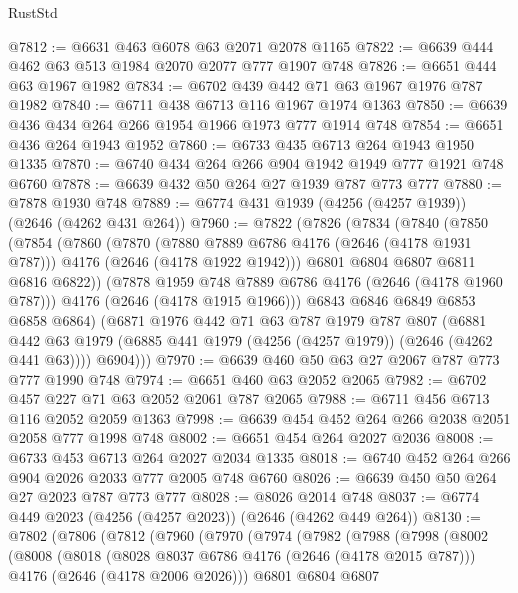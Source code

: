 \begin{lexlean}{RustStd}
\begin{coremodule}
@7812 := @6631 @463 @6078 @63 @2071 @2078 @1165
@7822 := @6639 @444 @462 @63 @513 @1984 @2070 @2077 @777 @1907 @748
@7826 := @6651 @444 @63 @1967 @1982
@7834 := @6702 @439 @442 @71 @63 @1967 @1976 @787 @1982
@7840 := @6711 @438 @6713 @116 @1967 @1974 @1363
@7850 := @6639 @436 @434 @264 @266 @1954 @1966 @1973 @777 @1914 @748
@7854 := @6651 @436 @264 @1943 @1952
@7860 := @6733 @435 @6713 @264 @1943 @1950 @1335
@7870 := @6740 @434 @264 @266 @904 @1942 @1949 @777 @1921 @748 @6760
@7878 := @6639 @432 @50 @264 @27 @1939 @787 @773 @777
@7880 := @7878 @1930 @748
@7889 := @6774 @431 @1939 (@4256 (@4257 @1939)) (@2646 (@4262 @431 @264))
@7960 := @7822
    (@7826
      (@7834
        (@7840
          (@7850
            (@7854
              (@7860
                (@7870
                  (@7880 @7889 @6786 @4176 (@2646 (@4178 @1931 @787)))
                  @4176
                  (@2646 (@4178 @1922 @1942)))
                @6801
                @6804
                @6807
                @6811
                @6816
                @6822))
            (@7878 @1959 @748 @7889 @6786 @4176 (@2646 (@4178 @1960 @787)))
            @4176
            (@2646 (@4178 @1915 @1966)))
          @6843
          @6846
          @6849
          @6853
          @6858
          @6864)
        (@6871
          @1976
          @442
          @71
          @63
          @787
          @1979
          @787
          @807
          (@6881 @442 @63 @1979 (@6885 @441 @1979 (@4256 (@4257 @1979)) (@2646 (@4262 @441 @63))))
          @6904)))
@7970 := @6639 @460 @50 @63 @27 @2067 @787 @773 @777 @1990 @748
@7974 := @6651 @460 @63 @2052 @2065
@7982 := @6702 @457 @227 @71 @63 @2052 @2061 @787 @2065
@7988 := @6711 @456 @6713 @116 @2052 @2059 @1363
@7998 := @6639 @454 @452 @264 @266 @2038 @2051 @2058 @777 @1998 @748
@8002 := @6651 @454 @264 @2027 @2036
@8008 := @6733 @453 @6713 @264 @2027 @2034 @1335
@8018 := @6740 @452 @264 @266 @904 @2026 @2033 @777 @2005 @748 @6760
@8026 := @6639 @450 @50 @264 @27 @2023 @787 @773 @777
@8028 := @8026 @2014 @748
@8037 := @6774 @449 @2023 (@4256 (@4257 @2023)) (@2646 (@4262 @449 @264))
@8130 := @7802
    (@7806
      (@7812
        (@7960
          (@7970
            (@7974
              (@7982
                (@7988
                  (@7998
                    (@8002
                      (@8008
                        (@8018
                          (@8028 @8037 @6786 @4176 (@2646 (@4178 @2015 @787)))
                          @4176
                          (@2646 (@4178 @2006 @2026)))
                        @6801
                        @6804
                        @6807

\end{coremodule}
\end{lexlean}
